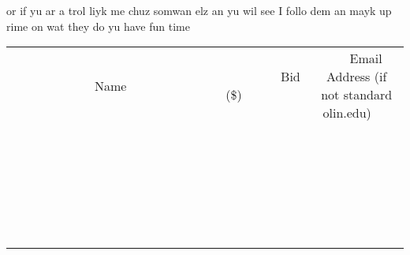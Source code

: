 \documentclass[11pt]{article}
\begin{document}
or if yu ar
a trol liyk me
chuz somwan elz
an yu wil see
I follo dem 
an mayk up rime
on wat they do
yu have fun time \\[6ex]
\begin{tabular}{c c c}
~~~~~~~~~~~~~Name~~~~~~~~~~~~~ & ~~~~~~~~~Bid (\$)~~~~~~~~~ & ~~~Email Address (if not standard olin.edu)~~~ \\
 & & \\
\hline
 & & \\
\hline
 & & \\
\hline
 & & \\
\hline
 & & \\
\hline
 & & \\
\hline
 & & \\
\hline
 & & \\
\hline
 & & \\
\hline
 & & \\
\hline
 & & \\
\hline
 & & \\
\hline
 & & \\
\hline
 & & \\
\hline
 & & \\
\hline
 & & \\
\hline
 & & \\
\hline
 & & \\
\hline
 & & \\
\hline
 & & \\
\hline
 & & \\
\hline
 & & \\
\hline
 & & \\
\hline
 & & \\
\hline
 & & \\
\hline
 & & \\
\hline
\end{tabular}
\clearpage
\end{document}
